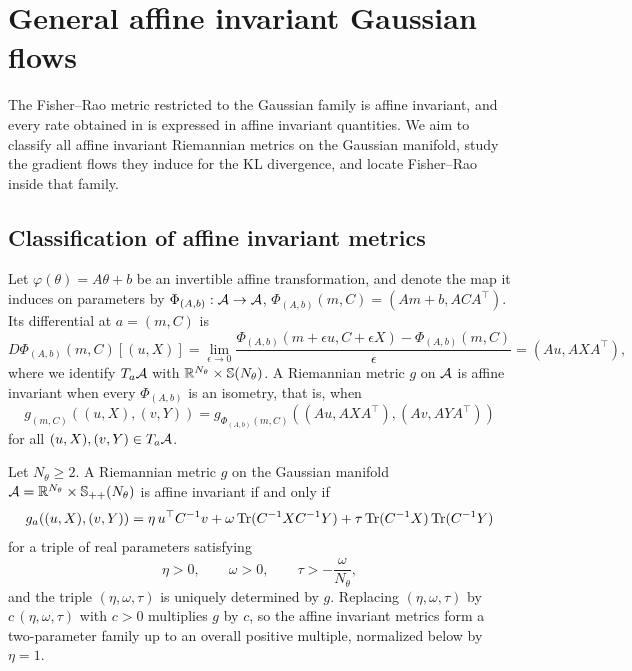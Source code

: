 \section{General affine invariant Gaussian flows}\label{sec:geometry}

The Fisher--Rao metric restricted to the Gaussian family is affine invariant, and every rate obtained in  is expressed in affine invariant quantities. We aim to classify all affine invariant Riemannian metrics on the Gaussian manifold, study the gradient flows they induce for the KL divergence, and locate Fisher--Rao inside that family.

\subsection{Classification of affine invariant metrics}

Let $\varphi(\theta) = A\theta + b$ be an invertible affine transformation, and denote the map it induces on parameters by $\Phi_{(A,b)} : \mathcal{A} \to \mathcal{A}$, $\Phi_{(A,b)} (m, C) = (Am + b, ACA^\top)$. Its differential at $a = (m,C)$ is
\begin{equation}\label{eq:aff-action}
    D\Phi_{(A,b)} (m, C) [(u, X)] = \lim_{\epsilon \to 0} \frac{\Phi_{(A,b)}(m + \epsilon u, C + \epsilon X) - \Phi_{(A,b)}(m, C)}{\epsilon} = (Au, AXA^\top),
\end{equation}
where we identify $T_a \mathcal{A}$ with $\mathbb{R}^{N_\theta} \times \mathbb{S}(N_\theta)$. A Riemannian metric $g$ on $\mathcal{A}$ is affine invariant when every $\Phi_{(A,b)}$ is an isometry, that is, when
\begin{equation}\label{eq:aff-isometry}
    g_{(m, C)} ((u, X), (v, Y)) = g_{\Phi_{(A,b)}(m, C)} ((Au, AXA^\top), (Av, AYA^\top))
\end{equation}
for all $(u,X), (v,Y) \in T_a\mathcal{A}$.

\begin{theorem}\label{thm:aff-class}
    Let $N_\theta \geq 2$. A Riemannian metric $g$ on the Gaussian manifold $\mathcal{A} = \mathbb{R}^{N_\theta} \times \mathbb{S}_{++}(N_\theta)$ is affine invariant if and only if
    \begin{equation}\label{eq:aff-metric}
        g_a ((u, X), (v, Y)) = \eta \, u^\top C^{-1} v + \omega \operatorname{Tr}(C^{-1} X C^{-1} Y) + \tau \operatorname{Tr}(C^{-1} X ) \operatorname{Tr}(C^{-1} Y)
    \end{equation}
    for a triple of real parameters satisfying
    \begin{equation}\label{eq:aff-positivity}
        \eta > 0, \qquad \omega > 0, \qquad \tau > - \frac{\omega}{N_\theta},
    \end{equation}
    and the triple $(\eta, \omega, \tau)$ is uniquely determined by $g$. Replacing $(\eta, \omega, \tau)$ by $c\,(\eta, \omega, \tau)$ with $c > 0$ multiplies $g$ by $c$, so the affine invariant metrics form a two-parameter family up to an overall positive multiple, normalized below by $\eta = 1$.
\end{theorem}

